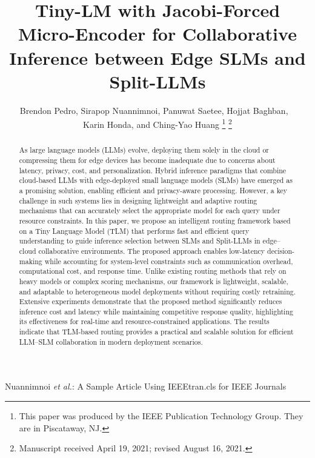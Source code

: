 \documentclass[lettersize,journal]{IEEEtran}
\begin{document}
\title{Tiny-LM with Jacobi-Forced Micro-Encoder for Collaborative Inference between Edge SLMs and Split-LLMs}

\author{Brendon Pedro, Sirapop Nuannimnoi, Panuwat Saetee, Hojjat Baghban, ~ \\ Karin Honda, and Ching-Yao Huang
\thanks{This paper was produced by the IEEE Publication Technology Group. They are in Piscataway, NJ.}%
\thanks{Manuscript received April 19, 2021; revised August 16, 2021.}}

%
{Nuannimnoi \MakeLowercase{\textit{et al.}}: A Sample Article Using IEEEtran.cls for IEEE Journals}


\maketitle

\begin{abstract}
    As large language models (LLMs) evolve, deploying them solely in the cloud or compressing them for edge devices has become inadequate due to concerns about latency, privacy, cost, and personalization. Hybrid inference paradigms that combine cloud-based LLMs with edge-deployed small language models (SLMs) have emerged as a promising solution, enabling efficient and privacy-aware processing. However, a key challenge in such systems lies in designing lightweight and adaptive routing mechanisms that can accurately select the appropriate model for each query under resource constraints. In this paper, we propose an intelligent routing framework based on a Tiny Language Model (TLM) that performs fast and efficient query understanding to guide inference selection between SLMs and Split-LLMs in edge–cloud collaborative environments. The proposed approach enables low-latency decision-making while accounting for system-level constraints such as communication overhead, computational cost, and response time. Unlike existing routing methods that rely on heavy models or complex scoring mechanisms, our framework is lightweight, scalable, and adaptable to heterogeneous model deployments without requiring costly retraining. Extensive experiments demonstrate that the proposed method significantly reduces inference cost and latency while maintaining competitive response quality, highlighting its effectiveness for real-time and resource-constrained applications. The results indicate that TLM-based routing provides a practical and scalable solution for efficient LLM–SLM collaboration in modern deployment scenarios.
\end{abstract}
\end{document}
